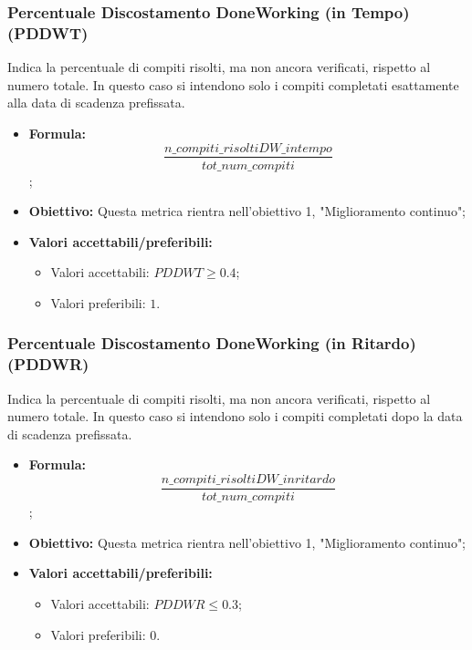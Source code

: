 \subsubsection{Percentuale Discostamento DoneWorking (in Tempo) (PDDWT)}
Indica la percentuale di compiti risolti, ma non ancora verificati, rispetto al numero totale. In questo caso si intendono solo i compiti completati esattamente alla data di scadenza prefissata.
\begin{itemize}
	\item \textbf{Formula:}\[\frac{n\_compiti\_risoltiDW\_intempo}{tot\_num\_compiti}\];
	\item \textbf{Obiettivo:} Questa metrica rientra nell'obiettivo 1, "Miglioramento continuo";
	\item \textbf{Valori accettabili/preferibili: }
	\begin{itemize}
		\item Valori accettabili: $PDDWT \geq 0.4$;
		\item Valori preferibili: $1$.
	\end{itemize}
\end{itemize}

\subsubsection{Percentuale Discostamento DoneWorking (in Ritardo) (PDDWR)}
Indica la percentuale di compiti risolti, ma non ancora verificati, rispetto al numero totale. In questo caso si intendono solo i compiti completati dopo la data di scadenza prefissata.
\begin{itemize}
	\item \textbf{Formula:}\[\frac{n\_compiti\_risoltiDW\_inritardo}{tot\_num\_compiti}\];
	\item \textbf{Obiettivo:} Questa metrica rientra nell'obiettivo 1, "Miglioramento continuo";
	\item \textbf{Valori accettabili/preferibili: }
	\begin{itemize}
		\item Valori accettabili: $PDDWR \leq 0.3$;
		\item Valori preferibili: $0$.
	\end{itemize}
\end{itemize}

